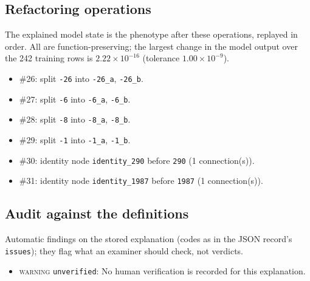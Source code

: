 \begin{drafted}
\subsection{Refactoring operations}\label{app:heart-s5-c1:operations}
The explained model state is the phenotype after these operations, replayed in order. All are function-preserving; the largest change in the model output over the 242 training rows is $2.22\times 10^{-16}$ (tolerance $1.00\times 10^{-9}$).
\begin{itemize}
\item \#26: split \texttt{-26} into \texttt{-26\_\allowbreak{}a}, \texttt{-26\_\allowbreak{}b}.
\item \#27: split \texttt{-6} into \texttt{-6\_\allowbreak{}a}, \texttt{-6\_\allowbreak{}b}.
\item \#28: split \texttt{-8} into \texttt{-8\_\allowbreak{}a}, \texttt{-8\_\allowbreak{}b}.
\item \#29: split \texttt{-1} into \texttt{-1\_\allowbreak{}a}, \texttt{-1\_\allowbreak{}b}.
\item \#30: identity node \texttt{identity\_\allowbreak{}290} before \texttt{290} (1 connection(s)).
\item \#31: identity node \texttt{identity\_\allowbreak{}1987} before \texttt{1987} (1 connection(s)).
\end{itemize}
\subsection{Audit against the definitions}\label{app:heart-s5-c1:audit}
Automatic findings on the stored explanation (codes as in the JSON record's \texttt{issues}); they flag what an examiner should check, not verdicts.
\begin{itemize}
\item \textsc{warning} \texttt{unverified}: No human verification is recorded for this explanation.
\end{itemize}
\end{drafted}
